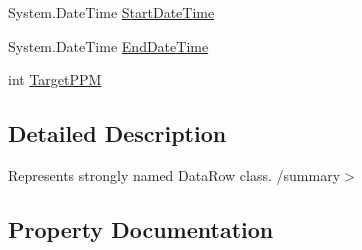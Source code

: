 \begin{DoxyCompactItemize}
System.\+Date\+Time \hyperlink{class_env_int_1_1_win32_1_1_field_tech_1_1_manager_1_1_data_sets_1_1_guide_ware_mobile_data_set_1_1_daily_calibration_row_ad1fee5a6e35385f5a2e491e47a3b5a72}{Start\+Date\+Time}
\item 
System.\+Date\+Time \hyperlink{class_env_int_1_1_win32_1_1_field_tech_1_1_manager_1_1_data_sets_1_1_guide_ware_mobile_data_set_1_1_daily_calibration_row_afbdecde66345806f60b32b446ca2af73}{End\+Date\+Time}
\item 
int \hyperlink{class_env_int_1_1_win32_1_1_field_tech_1_1_manager_1_1_data_sets_1_1_guide_ware_mobile_data_set_1_1_daily_calibration_row_a999e3dd144d1928571b0eb3fc42ee426}{Target\+P\+P\+M}
\end{DoxyCompactItemize}


\subsection{Detailed Description}
Represents strongly named Data\+Row class. /summary$>$ 

\subsection{Property Documentation}
\hypertarget{class_env_int_1_1_win32_1_1_field_tech_1_1_manager_1_1_data_sets_1_1_guide_ware_mobile_data_set_1_1_daily_calibration_row_aab1572dd9e4884b418118b9866227c3e}{}
